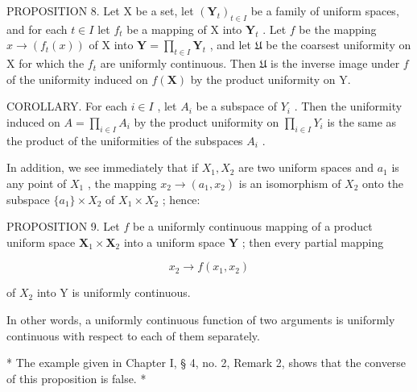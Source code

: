 PROPOSITION 8. Let X be a set, let \((\mathbf{Y}_t)_{t \in I}\) be a family of uniform spaces, and for each \(t \in I\) let \(f_t\) be a mapping of X into \(\mathbf{Y}_t\) . Let \(f\) be the mapping \(x \to (f_t(x))\) of X into \(\mathbf{Y} = \prod_{t \in I} \mathbf{Y}_t\) , and let \(\mathfrak{U}\) be the coarsest uniformity on X for which the \(f_t\) are uniformly continuous. Then \(\mathfrak{U}\) is the inverse image under \(f\) of the uniformity induced on \(f(\mathbf{X})\) by the product uniformity on Y.

COROLLARY. For each \(i \in I\) , let \(A_{i}\) be a subspace of \(Y_{i}\) . Then the uniformity induced on \(A = \prod_{i \in I} A_{i}\) by the product uniformity on \(\prod_{i \in I} Y_{i}\) is the same as the product of the uniformities of the subspaces \(A_{i}\) .

In addition, we see immediately that if \(X_{1}, X_{2}\) are two uniform spaces and \(a_{1}\) is any point of \(X_{1}\) , the mapping \(x_{2} \to (a_{1}, x_{2})\) is an isomorphism of \(X_{2}\) onto the subspace \(\{a_{1}\} \times X_{2}\) of \(X_{1} \times X_{2}\) ; hence:

PROPOSITION 9. Let \(f\) be a uniformly continuous mapping of a product uniform space \(\mathbf{X}_1 \times \mathbf{X}_2\) into a uniform space \(\mathbf{Y}\) ; then every partial mapping

\[
x _ {2} \rightarrow f (x _ {1}, x _ {2})
\]

of \(X_{2}\) into Y is uniformly continuous.

In other words, a uniformly continuous function of two arguments is uniformly continuous with respect to each of them separately.

* The example given in Chapter I, § 4, no. 2, Remark 2, shows that the converse of this proposition is false. *

